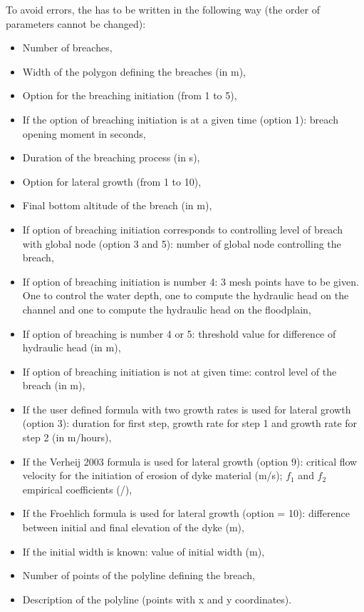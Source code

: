 To avoid errors, the  has to be written in the
following way (the order of parameters cannot be changed):
\begin{itemize}
\item Number of breaches,
\item Width of the polygon defining the breaches (in m),
\item Option for the breaching initiation (from 1 to 5),
\item If the option of breaching initiation is at a given time (option 1):
breach opening moment in seconds,
\item Duration of the breaching process (in s),
\item Option for lateral growth (from 1 to 10),
\item Final bottom altitude of the breach (in m),
\item If option of breaching initiation corresponds to controlling level of
breach with global node (option 3 and 5): number of global node controlling the breach,
\item If option of breaching initiation is number 4: 3 mesh points have to be given.
One to control the water depth, one to compute the hydraulic head on the channel and
one to compute the hydraulic head on the floodplain,
\item If option of breaching is number 4 or 5: threshold value for difference of hydraulic
head (in m),
\item If option of breaching initiation is not at given time: control level of
the breach (in m),
\item If the user defined formula with two growth rates is used for lateral
growth (option 3): duration for first step, growth rate for step 1 and growth
rate for step 2 (in m/hours),
\item If the Verheij 2003 formula is used for lateral growth (option 9):
critical flow velocity for the initiation of erosion of dyke material (m/s);
$f_1$ and $f_2$ empirical coefficients (/),
\item If the Froehlich formula is used for lateral growth (option = 10):
difference between initial and final elevation of the dyke (m),
\item If the initial width is known: value of initial width (m),
\item Number of points of the polyline defining the breach,
\item Description of the polyline (points with x and y coordinates).
\end{itemize}

